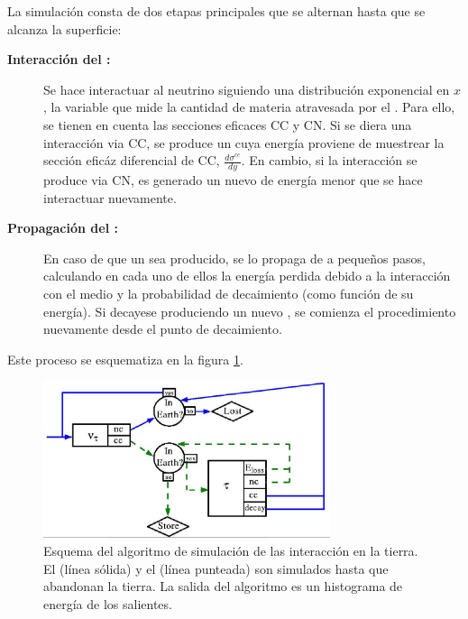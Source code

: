 		La simulaci\'on consta de dos etapas principales que se alternan hasta que se alcanza la superficie:
		\begin{description}
		\item[\textbf{Interacci\'on del \nutau{}:}] Se hace interactuar al neutrino siguiendo una distribuci\'on exponencial en $x$, la variable que mide la cantidad de materia atravesada por el \nutau{}. Para ello, se tienen en cuenta las secciones eficaces CC y CN. Si se diera una interacci\'on via CC, se produce un \tauon{} cuya energ\'ia proviene de muestrear la sección efic\'az diferencial de CC, $\frac{d\sigma^{cc}}{dy}$. En cambio, si la interacci\'on se produce via CN, es generado un nuevo \nutau{} de energ\'ia menor que se hace interactuar nuevamente.
		\item[\textbf{Propagaci\'on del \tauon{}:}] En caso de que un \tauon{} sea producido, se lo propaga de a peque\~nos pasos, calculando en cada uno de ellos la energ\'ia perdida debido a la interacci\'on con el medio y la probabilidad de decaimiento (como funci\'on de su energ\'ia). Si decayese produciendo un nuevo \nutau{}, se comienza el procedimiento nuevamente desde el punto de decaimiento.
		\end{description}
		Este proceso se esquematiza en la figura \ref{fig:tau_sim_sch}.
		\begin{figure}[ht!]
			\begin{center}
			\includegraphics[width=0.75\textwidth]{fig/simulacionAuger/schemeEarthProp}
			\caption{\label{fig:tau_sim_sch} Esquema del algoritmo de simulación de las interacción en la tierra. El \nutau{} (línea sólida) y el \tauon{} (línea punteada) son simulados hasta que abandonan la tierra. La salida del algoritmo es un histograma de energía de los \tauon{} salientes.}
			\end{center}
		\end{figure}
		
